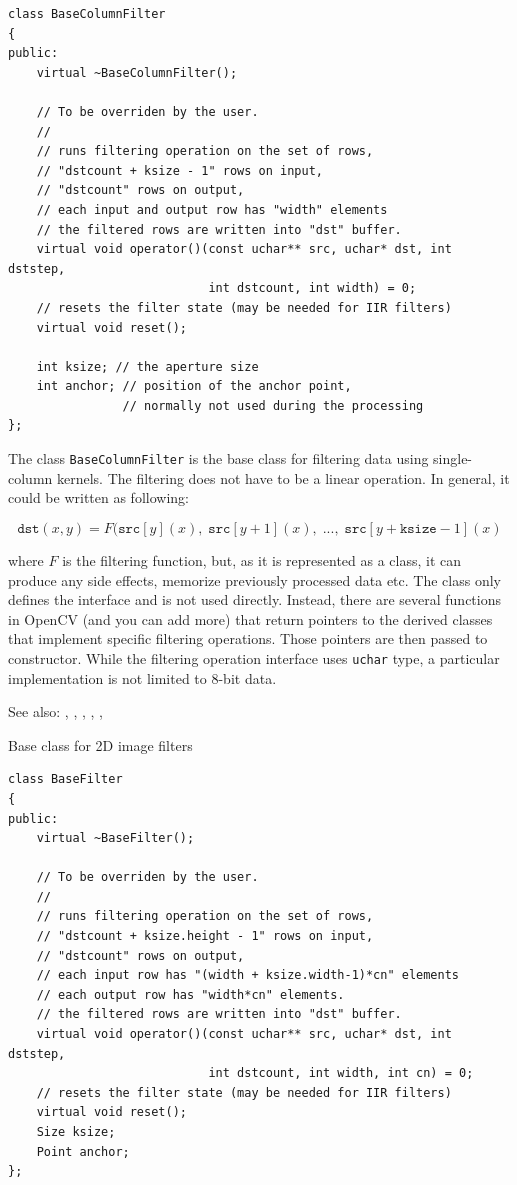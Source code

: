 \begin{lstlisting}
class BaseColumnFilter
{
public:
    virtual ~BaseColumnFilter();
    
    // To be overriden by the user.
    //
    // runs filtering operation on the set of rows,
    // "dstcount + ksize - 1" rows on input,
    // "dstcount" rows on output,
    // each input and output row has "width" elements
    // the filtered rows are written into "dst" buffer.
    virtual void operator()(const uchar** src, uchar* dst, int dststep,
                            int dstcount, int width) = 0;
    // resets the filter state (may be needed for IIR filters)
    virtual void reset();
    
    int ksize; // the aperture size
    int anchor; // position of the anchor point,
                // normally not used during the processing
};
\end{lstlisting}

The class \texttt{BaseColumnFilter} is the base class for filtering data using single-column kernels. The filtering does not have to be a linear operation. In general, it could be written as following:

\[\texttt{dst}(x,y) = F(\texttt{src}[y](x),\;\texttt{src}[y+1](x),\;...,\;\texttt{src}[y+\texttt{ksize}-1](x)\]

where $F$ is the filtering function, but, as it is represented as a class, it can produce any side effects, memorize previously processed data etc. The class only defines the interface and is not used directly. Instead, there are several functions in OpenCV (and you can add more) that return pointers to the derived classes that implement specific filtering operations. Those pointers are then passed to  constructor. While the filtering operation interface uses \texttt{uchar} type, a particular implementation is not limited to 8-bit data.

See also: , , ,
    , , 


\label{BaseFilter}
Base class for 2D image filters

\begin{lstlisting}
class BaseFilter
{
public:
    virtual ~BaseFilter();
    
    // To be overriden by the user.
    //
    // runs filtering operation on the set of rows,
    // "dstcount + ksize.height - 1" rows on input,
    // "dstcount" rows on output,
    // each input row has "(width + ksize.width-1)*cn" elements
    // each output row has "width*cn" elements.
    // the filtered rows are written into "dst" buffer.
    virtual void operator()(const uchar** src, uchar* dst, int dststep,
                            int dstcount, int width, int cn) = 0;
    // resets the filter state (may be needed for IIR filters)                        
    virtual void reset();
    Size ksize;
    Point anchor;
};
\end{lstlisting}

